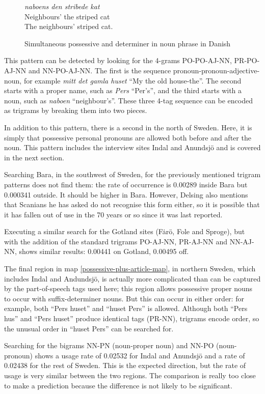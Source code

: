 \begin{figure}
  {\it naboens den stribede kat} \\
  Neighbours' the striped cat \\
  The neighbours' striped cat.
  \caption{Simultaneous possessive and determiner in noun phrase in
    Danish}
  \label{possessive-plus-article-example}
\end{figure}

This pattern can be detected by looking for the
4-grams PO-PO-AJ-NN, PR-PO-AJ-NN and NN-PO-AJ-NN. The first is the
sequence pronoun-pronoun-adjective-noun, for example {\it mitt det
  gamla huset} ``My the old house-the''. The second starts with a
proper name, such as {\it Pers} ``Per's'', and the third starts with a
noun, such as {\it naboen} ``neighbour's''. These three 4-tag sequence
can be encoded as trigrams by breaking them into two pieces.

In addition to this pattern, there is a second in the north of
Sweden. Here, it is simply that possessive personal pronouns are
allowed both before and after the noun. This pattern includes the
interview sites Indal and Anundsj\"o and is covered in the next
section.

Searching Bara, in the southwest of Sweden, for the previously
mentioned trigram patterns does not find them: the rate of occurrence
is 0.00289 inside Bara but 0.000341 outside. It should be higher in
Bara. However, Delsing also mentions that Scanians he has asked do not
recognise this form either, so it is possible that it has fallen out
of use in the 70 years or so since it was last reported.

Executing a similar search for the Gotland sites (F\.ar\"o, Fole and
Sproge), but with the addition of the standard trigrams PO-AJ-NN,
PR-AJ-NN and NN-AJ-NN, shows similar results: 0.00441 on Gotland,
0.00495 off.

The final region in map \ref{possessive-plus-article-map}, in northern
Sweden, which includes Indal and Andundsj\"o, is actually more
complicated than can be captured by the part-of-speech tags used here;
this region allows possessive proper nouns to occur with
suffix-determiner nouns. But this can occur in either order: for
example, both ``Pers huset'' and ``huset Pers'' is allowed. Although
both ``Pers hus'' and ``Pers huset'' produce identical tags (PR-NN),
trigrams encode order, so the unusual order in ``huset Pers'' can be
searched for.

Searching for the bigrams NN-PN (noun-proper noun) and NN-PO
(noun-pronoun) shows a usage rate of 0.02532 for Indal and Anundsj\"o
and a rate of 0.02438 for the rest of Sweden. This is the expected
direction, but the rate of usage is very similar between the two
regions. The comparison is really too close to make a prediction
because the difference is not likely to be significant.

